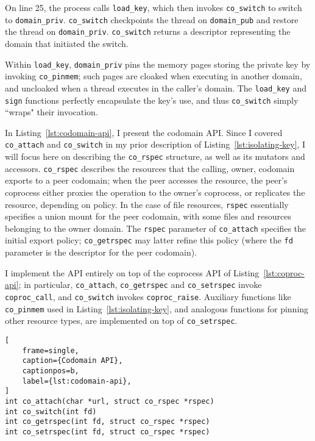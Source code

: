 On line 25, the process calls \texttt{load\_key}, which then invokes
\texttt{co\_switch} to switch to \texttt{domain\_priv}.
%
\texttt{co\_switch} checkpoints the thread on \texttt{domain\_pub} and restore
the thread on \texttt{domain\_priv}.
%
\texttt{co\_switch} returns a descriptor representing the domain that
initiated the switch.


Within \texttt{load\_key}, \texttt{domain\_priv} pins the memory pages storing
the private key by invoking \texttt{co\_pinmem};
such pages are cloaked when executing in another
domain, and uncloaked when a thread executes in the caller's domain.
%
The \texttt{load\_key} and \texttt{sign}
functions perfectly encapsulate the key's use, and thus  \texttt{co\_switch}
simply ``wraps" their invocation.


%
In Listing~\ref{lst:codomain-api}, I present the codomain API\@.
%
Since I covered \texttt{co\_attach} and \texttt{co\_switch} in my prior
description of Listing~\ref{lst:isolating-key}, I will focus here on describing
the \texttt{co\_rspec} structure, as well as its mutators and accessors.
%
\texttt{co\_rspec} describes the resources that the calling, owner, codomain
exports to a peer codomain; when the peer accesses the resource, the peer's
coprocess either proxies the operation to the owner's coprocess, or replicates
the resource, depending on policy.
%
In the case of file resources, \texttt{rspec} essentially specifies a union
mount for the peer codomain, with some files and resources belonging to the
owner domain.
%
The \texttt{rspec} parameter of \texttt{co\_attach} specifies the initial
export policy; \texttt{co\_getrspec} may latter refine this policy (where
the \texttt{fd} parameter is the descriptor for the peer codomain).


I implement the API entirely on top of the coprocess API of
Listing~\ref{lst:coproc-api}; in particular, \texttt{co\_attach},
\texttt{co\_getrspec} and \texttt{co\_setrspec} invoke \texttt{coproc\_call},
and \texttt{co\_switch} invokes \texttt{coproc\_raise}.
%
Auxiliary functions like \texttt{co\_pinmem} used in
Listing~\ref{lst:isolating-key}, and analogous functions for pinning other
resource types, are implemented on top of \texttt{co\_setrspec}.

\begin{lstlisting}[
    frame=single,
    caption={Codomain API},
    captionpos=b,
    label={lst:codomain-api},
]
int co_attach(char *url, struct co_rspec *rspec)
int co_switch(int fd)
int co_getrspec(int fd, struct co_rspec *rspec)
int co_setrspec(int fd, struct co_rspec *rspec)
\end{lstlisting}

